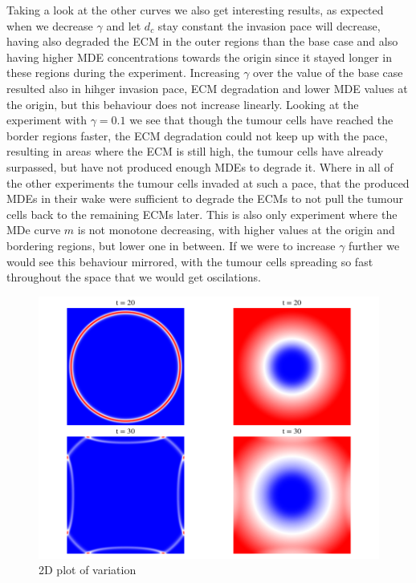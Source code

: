 Taking a look at the other curves we also get interesting results, as expected when we decrease $\gamma$ and let $d_c$ stay constant the invasion pace will decrease, having also degraded the ECM in the outer regions than the base case and also having higher MDE concentrations towards the origin since it stayed longer in these regions during the experiment. Increasing $\gamma$ over the value of the base case resulted also in hihger invasion pace, ECM degradation and lower MDE values at the origin, but this behaviour does not increase linearly. Looking at the experiment with $\gamma=0.1$ we see that though the tumour cells have reached the border regions faster, the ECM degradation could not keep up with the pace, resulting in areas where the ECM is still high, the tumour cells have already surpassed, but have not produced enough MDEs to degrade it. Where in all of the other experiments the tumour cells invaded at such a pace, that the produced MDEs in their wake were sufficient to degrade the ECMs to not pull the tumour cells back to the remaining ECMs later. This is also only experiment where the MDe curve $m$ is not monotone decreasing, with higher values at the origin and bordering regions, but lower one in between. If we were to increase $\gamma$ further we would see this behaviour mirrored, with the tumour cells spreading so fast throughout the space that we would get oscilations.
\begin{figure}[h]
    \centering
    \includegraphics[width=\textwidth]{resources/images/2D_plot.png}
    \caption{2D plot of variation}
    \label{fig:gamma_2D_plot}
\end{figure}
